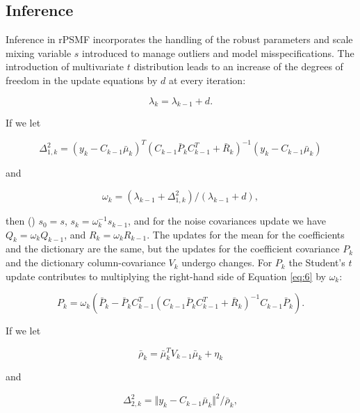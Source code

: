 \documentclass{mldsmsc}
\begin{document}
\subsection{Inference}

Inference in rPSMF incorporates the handling of the robust parameters and scale mixing variable \( s \) introduced to manage outliers and model misspecifications. The introduction of multivariate $t$ distribution leads to an increase of the degrees of freedom in the update equations by $d$ at every iteration:

\begin{equation}
    \lambda_k = \lambda_{k-1} + d.
\end{equation}

\noindent If we let 

\begin{equation}
    \Delta^2_{1,k} = (y_k - C_{k-1}\bar{\mu}_k)^T (C_{k-1} \bar{P}_k C_{k-1}^T + \bar{R}_k)^{-1} (y_k - C_{k-1}\bar{\mu}_k)
\end{equation}

\noindent and 

\begin{equation}
    \omega_k = (\lambda_{k-1} + \Delta^2_{1,k}) / (\lambda_{k-1} + d),
\end{equation}

\noindent then (\cite{akyildiz2021probabilistic}) $s_0 = s$, $s_k = \omega_k^{-1} s_{k-1}$, and for the noise covariances update we have $Q_k = \omega_k Q_{k-1}$, and $R_k = \omega_k R_{k-1}$. The updates for the mean for the coefficients and the dictionary are the same, but the updates for the coefficient covariance $P_k$ and the dictionary column-covariance $V_k$ undergo changes. For $P_k$ the Student's $t$ update contributes to multiplying the right-hand side of Equation \ref{eq:6} by $\omega_k$:

\begin{equation}
    P_k = \omega_k \left(\bar{P}_k - \bar{P}_k C_{k-1}^T \left(C_{k-1} \bar{P}_k C_{k-1}^T + \bar{R}_k\right)^{-1} C_{k-1} \bar{P}_k\right).
\end{equation}

\noindent If we let 

\begin{equation}
    \bar{\rho}_k = \bar{\mu}_k^T V_{k-1} \bar{\mu}_k + \eta_k
\end{equation}

\noindent and

\begin{equation}
    \Delta^2_{2,k} = \Vert y_k - C_{k-1}\bar{\mu}_k \Vert^2 / \bar{\rho}_k,
\end{equation}
\end{document}
